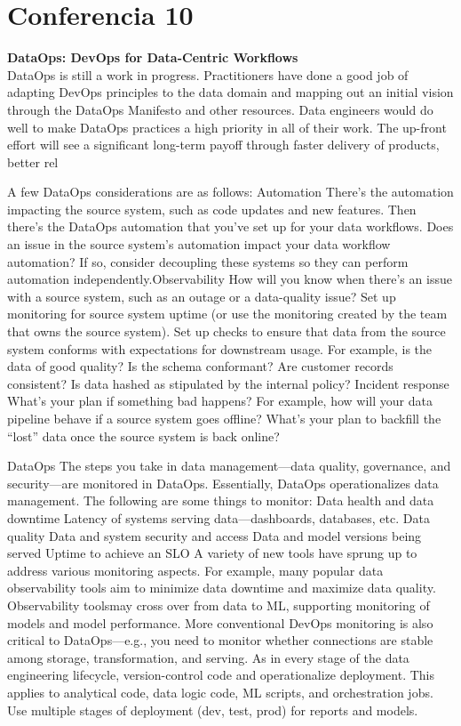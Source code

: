 \documentclass[12pt]{book}
\begin{document}
\chapter{Conferencia 10}
\normalfont\LARGE \textbf{DataOps: DevOps for Data-Centric Workflows}
\normalfont\small\\
DataOps is still a work in progress. Practitioners have done a
good job of adapting DevOps principles to the data domain and mapping
out an initial vision through the DataOps Manifesto and other resources.
Data engineers would do well to make DataOps practices a high priority in
all of their work. The up-front effort will see a significant long-term payoff
through faster delivery of products, better rel

A few DataOps considerations are as follows:
Automation
There's the automation impacting the source system, such as code
updates and new features. Then there's the DataOps automation that
you've set up for your data workflows. Does an issue in the source
system's automation impact your data workflow automation? If so,
consider decoupling these systems so they can perform automation
independently.Observability
How will you know when there's an issue with a source system, such as
an outage or a data-quality issue? Set up monitoring for source system
uptime (or use the monitoring created by the team that owns the source
system). Set up checks to ensure that data from the source system
conforms with expectations for downstream usage. For example, is the
data of good quality? Is the schema conformant? Are customer records
consistent? Is data hashed as stipulated by the internal policy?
Incident response
What's your plan if something bad happens? For example, how will
your data pipeline behave if a source system goes offline? What's your
plan to backfill the “lost” data once the source system is back online?

DataOps
The steps you take in data management—data quality, governance, and
security—are monitored in DataOps. Essentially, DataOps operationalizes
data management. The following are some things to monitor:
Data health and data downtime
Latency of systems serving data—dashboards, databases, etc.
Data quality
Data and system security and access
Data and model versions being served
Uptime to achieve an SLO
A variety of new tools have sprung up to address various monitoring
aspects. For example, many popular data observability tools aim to
minimize data downtime and maximize data quality. Observability toolsmay cross over from data to ML, supporting monitoring of models and
model performance. More conventional DevOps monitoring is also critical
to DataOps—e.g., you need to monitor whether connections are stable
among storage, transformation, and serving.
As in every stage of the data engineering lifecycle, version-control code and
operationalize deployment. This applies to analytical code, data logic code,
ML scripts, and orchestration jobs. Use multiple stages of deployment (dev,
test, prod) for reports and models.
\end{document}
